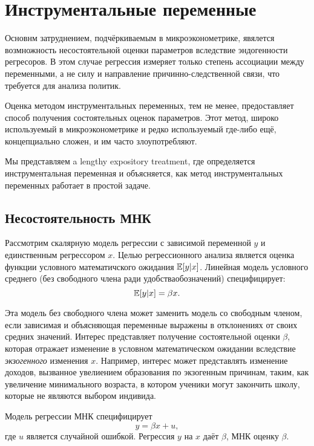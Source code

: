 \section{Инструментальные переменные}

Основнм затруднением, подчёркиваемым в микроэконометрике, явялется возмножность несостоятельной оценки параметров вследствие эндогенности регресоров. В этом случае регрессия измеряет только степень ассоциации между переменными, а не силу и направление причинно-следственной связи, что требуется для анализа политик.

Оценка методом инструментальных переменных, тем не менее, предоставляет способ получения состоятельных оценок параметров. Этот метод, широко используемый в микроэконометрике и редко используемый где-либо ещё, концепциально сложен, и им часто злоупотребляют.

Мы представляем a lengthy expository treatment, где определяется инструментальная переменная и объясняется, как метод инструментальных переменных работает в простой задаче.

\subsection{Несостоятельность МНК}

Рассмотрим скалярную модель регрессии с зависимой переменной $y$ и единственным регрессором $x$. Целью регрессионного анализа является оценка функции условного математичского ожидания $\mathbb{E}[y|x]$. Линейная модель условного среднего (без свободного члена ради удобстваобозначений) специфицирует:
\begin{equation}
\mathbb{E}[y|x] = \beta x.
\end{equation}

Эта модель без свободного члена может заменить модель со свободным членом, если зависимая и объясняющая переменные выражены в отклонениях от своих средних значений. Интерес представляет получение состоятельной оценки $\beta$, которая отражает изменение в условном математическом ожидании вследствие \textit{экзогенного} изменения $x$. Например, интерес может представлять изменение доходов, вызванное увелиением образования по экзогенным причинам, таким, как увеличение минимального возраста, в котором ученики могут закончить школу, которые не являются выбором индивида.

Модель регрессии МНК специфицирует 
\begin{equation}
y = \beta x +u,
\end{equation}
где $u$ является случайной ошибкой. Регрессия $y$ на $x$ даёт $\hat{\beta}$, МНК оценку $\beta$. 

